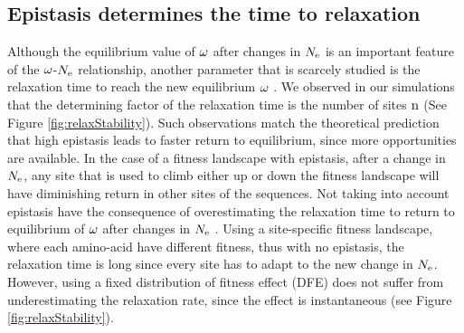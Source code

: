 \documentclass{article}
\begin{document}
\subsection*{Epistasis determines the time to relaxation}
Although the equilibrium value of $\omega$ after changes in $N_{\mathrm{e}}$ is an important feature of the $\omega$-$N_{\mathrm{e}}$ relationship, another parameter that is scarcely studied is the relaxation time to reach the new equilibrium $\omega$ \cite{Jones2016}.
We observed in our simulations that the determining factor of the relaxation time is the number of sites $\text{n}$ (See Figure \ref{fig:relaxStability}).
Such observations match the theoretical prediction that high epistasis leads to faster return to equilibrium, since more opportunities are available.
In the case of a fitness landscape with epistasis, after a change in $N_{\mathrm{e}}$, any site that is used to climb either up or down the fitness landscape will have diminishing return in other sites of the sequences.
Not taking into account epistasis have the consequence of overestimating the relaxation time to return to equilibrium of $\omega$ after changes in $N_{\mathrm{e}}$ .
Using a site-specific fitness landscape, where each amino-acid have different fitness, thus with no epistasis, the relaxation time is long since every site has to adapt to the new change in $N_{\mathrm{e}}$.
However, using a fixed distribution of fitness effect (DFE) does not suffer from underestimating the relaxation rate, since the effect is instantaneous (see Figure \ref{fig:relaxStability}).
\end{document}
